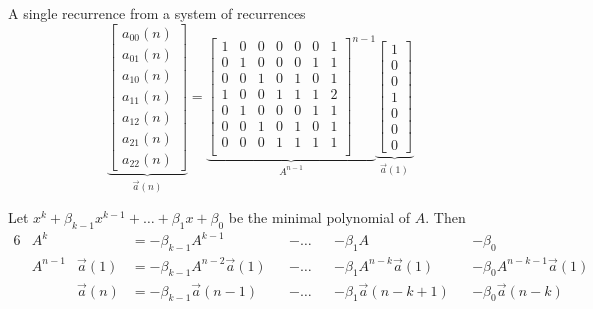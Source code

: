 \documentclass{beamer}%
\newcommand\indxx[2]{#1#2}
\begin{document}
\begin{frame}{A single recurrence from a system of recurrences}
  \[
    \underbrace{\begin{bmatrix}
      a_{\indxx 00}(n) \\
      a_{\indxx 01}(n) \\
      a_{\indxx 10}(n) \\
      a_{\indxx 11}(n) \\
      a_{\indxx 12}(n) \\
      a_{\indxx 21}(n) \\
      a_{\indxx 22}(n)
    \end{bmatrix}}_{\vec a(n)}
    =
    \underbrace{\begin{bmatrix}
      1 & 0 & 0 & 0 & 0 & 0 & 1 \\ %
      0 & 1 & 0 & 0 & 0 & 1 & 1 \\ %
      0 & 0 & 1 & 0 & 1 & 0 & 1 \\ %
      1 & 0 & 0 & 1 & 1 & 1 & 2 \\ %
      0 & 1 & 0 & 0 & 0 & 1 & 1 \\ %
      0 & 0 & 1 & 0 & 1 & 0 & 1 \\ %
      0 & 0 & 0 & 1 & 1 & 1 & 1 \\ %
    \end{bmatrix}^{n-1}}_{A^{n-1}}
    \underbrace{\begin{bmatrix}
      1 \\ 0 \\ 0 \\ 1 \\ 0 \\ 0 \\ 0
    \end{bmatrix}}_{\vec a(1)}
  \]

  Let $x^k + \beta_{k-1}x^{k-1} + \hdots + \beta_1 x + \beta_0$
  be the minimal polynomial of $A$.
  Then \begin{alignat*}{6}
    &A^k    &          &= -\beta_{k-1}A^{k-1}          &&- \hdots &&- \beta_1 A                &&- \beta_0 \\
    &A^{n-1}&\vec a(1) &= -\beta_{k-1}A^{n-2}\vec a(1) &&- \hdots &&- \beta_1 A^{n-k}\vec a(1) &&- \beta_0 A^{n-k-1}\vec a(1) \\
    &       &\vec a(n) &= -\beta_{k-1}\vec a(n-1)      &&- \hdots && - \beta_1 \vec a(n-k+1)   &&- \beta_0 \vec a(n-k)
  \end{alignat*}
\end{frame}
\end{document}
